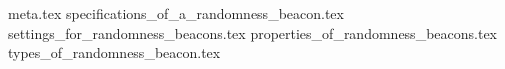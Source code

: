 {meta.tex}
{specifications_of_a_randomness_beacon.tex}
{settings_for_randomness_beacons.tex}
{properties_of_randomness_beacons.tex}
{types_of_randomness_beacon.tex}
